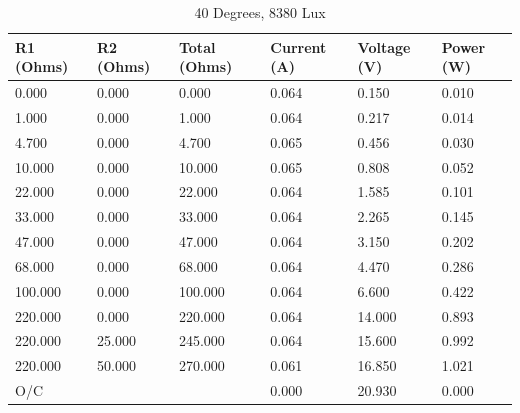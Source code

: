 \documentclass{article}
\begin{document}
		\begin{table}[H]
			\centering
			\caption{40 Degrees, 8380 Lux}
			\begin{tabular}{|l|l|l|l|l|l|}
				\hline
				
				\textbf{R1 (Ohms)} & \textbf{R2 (Ohms)} & \textbf{Total (Ohms)} & \textbf{Current (A)} & \textbf{Voltage (V)} & \textbf{Power (W)} \\ \hline
				0.000 & 0.000 & 0.000 & 0.064 & 0.150 & 0.010 \\ \hline
				1.000 & 0.000 & 1.000 & 0.064 & 0.217 & 0.014 \\ \hline
				4.700 & 0.000 & 4.700 & 0.065 & 0.456 & 0.030 \\ \hline
				10.000 & 0.000 & 10.000 & 0.065 & 0.808 & 0.052 \\ \hline
				22.000 & 0.000 & 22.000 & 0.064 & 1.585 & 0.101 \\ \hline
				33.000 & 0.000 & 33.000 & 0.064 & 2.265 & 0.145 \\ \hline
				47.000 & 0.000 & 47.000 & 0.064 & 3.150 & 0.202 \\ \hline
				68.000 & 0.000 & 68.000 & 0.064 & 4.470 & 0.286 \\ \hline
				100.000 & 0.000 & 100.000 & 0.064 & 6.600 & 0.422 \\ \hline
				220.000 & 0.000 & 220.000 & 0.064 & 14.000 & 0.893 \\ \hline
				220.000 & 25.000 & 245.000 & 0.064 & 15.600 & 0.992 \\ \hline
				220.000 & 50.000 & 270.000 & 0.061 & 16.850 & 1.021 \\ \hline
				O/C & & & 0.000 & 20.930 & 0.000 \\ \hline
				
			\end{tabular}
		\end{table}
	
\end{document}
